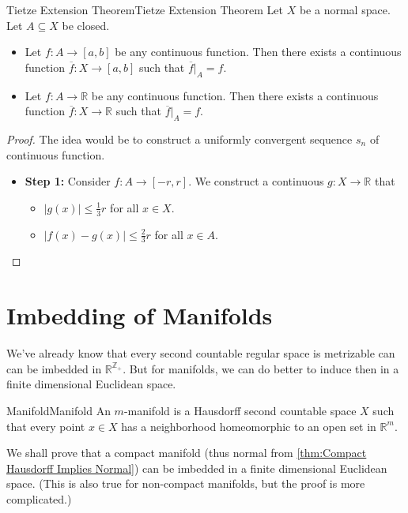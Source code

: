\documentclass[../main.tex]{subfiles}
\begin{document}
\begin{theorem}{Tietze Extension Theorem}{Tietze Extension Theorem}
	Let $X$ be a normal space. Let $A \subseteq X$ be closed.
	\begin{itemize}
		\item Let $f:A \rightarrow [a,b]$ be any continuous function. Then there exists a continuous function $\overline{f}: X \rightarrow [a,b]$ such that $\overline{f}|_A = f$.
		\item Let $f:A \rightarrow \mathbb{R}$ be any continuous function. Then there exists a continuous function $\overline{f}: X \rightarrow \mathbb{R}$ such that $\overline{f}|_A = f$.
	\end{itemize}
\end{theorem}
\begin{proof}
The idea would be to construct a uniformly convergent sequence $s_n$ of continuous function.
\begin{itemize}
	\item \textbf{Step 1: } Consider $f: A \rightarrow [-r,r]$. We construct a continuous $g:X \rightarrow \mathbb{R}$ that
		\begin{itemize}
			\item $\left|g(x)\right| \leq \frac{1}{3}r$ for all $x\in X$.
			\item $\left|f(x)-g(x)\right| \leq \frac{2}{3}r$ for all $x\in A$.
		\end{itemize}
\end{itemize}
\end{proof}

\section{Imbedding of Manifolds}
We've already know that every second countable regular space is metrizable can can be imbedded in $\mathbb{R}^{\mathbb{Z}_+}$. But for manifolds, we can do better to induce then in a finite dimensional Euclidean space.

\begin{definition}{Manifold}{Manifold}
	An $m$-manifold is a Hausdorff second countable space $X$ such that every point $x\in X$ has a neighborhood homeomorphic to an open set in $\mathbb{R}^m$.
\end{definition}

We shall prove that a compact manifold (thus normal from \ref{thm:Compact Hausdorff Implies Normal}) can be imbedded in a finite dimensional Euclidean space. (This is also true for non-compact manifolds, but the proof is more complicated.)
\end{document}
